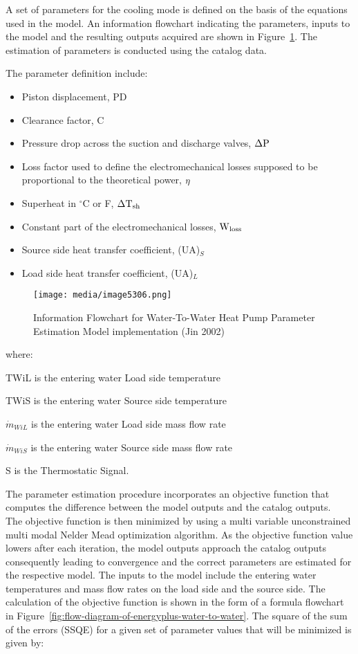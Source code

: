 A set of parameters for the cooling mode is defined on the basis of the equations used in the model. An information flowchart indicating the parameters, inputs to the model and the resulting outputs acquired are shown in Figure~\ref{fig:information-flowchart-for-water-to-water-heat}. The estimation of parameters is conducted using the catalog data.

The parameter definition include:

\begin{itemize}
\item Piston displacement, PD
\item Clearance factor, C
\item Pressure drop across the suction and discharge valves, \({\rm{\Delta P}}\)
\item Loss factor used to define the electromechanical losses supposed to be proportional to the theoretical power, \({\rm{\eta }}\)
\item Superheat in \(^{\circ}\)C or F, \({\rm{\Delta T}}{}_{{\rm{sh}}}\)
\item Constant part of the electromechanical losses, \({\rm{W}}{}_{{\rm{loss}}}\)
\item Source side heat transfer coefficient, (UA)\(_{S}\)
\item Load side heat transfer coefficient, (UA)\(_{L}\)
\end{itemize}

\begin{figure}[hbtp] %
\centering
\texttt{[image: media/image5306.png]}
\caption{Information Flowchart for Water-To-Water Heat Pump Parameter Estimation Model implementation (Jin 2002) \protect \label{fig:information-flowchart-for-water-to-water-heat}}
\end{figure}

where:

TWiL is the entering water Load side temperature

TWiS is the entering water Source side temperature

\({\dot{m}_{WiL}}\) is the entering water Load side mass flow rate

\({\dot{m}_{WiS}}\) is the entering water Source side mass flow rate

S is the Thermostatic Signal.

The parameter estimation procedure incorporates an objective function that computes the difference between the model outputs and the catalog outputs.~ The objective function is then minimized by using a multi variable unconstrained multi modal Nelder Mead optimization algorithm. As the objective function value lowers after each iteration, the model outputs approach the catalog outputs consequently leading to convergence and the correct parameters are estimated for the respective model. The inputs to the model include the entering water temperatures and mass flow rates on the load side and the source side. The calculation of the objective function is shown in the form of a formula flowchart in Figure~\ref{fig:flow-diagram-of-energyplus-water-to-water}. The square of the sum of the errors (SSQE) for a given set of parameter values that will be minimized is given by:

